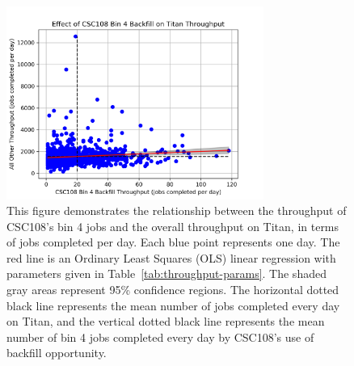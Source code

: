 \begin{figure}
  \includegraphics[width=0.75\textwidth]{images/linfit-throughput-bin4.png}
\caption{This figure demonstrates the relationship between the throughput of
CSC108's bin 4 jobs and the overall throughput on Titan, in terms of jobs
completed per day. Each blue point represents one day. The red line is an
Ordinary Least Squares (OLS) linear regression with parameters given in
Table~\ref{tab:throughput-params}. The shaded gray areas represent 95\%
confidence regions. The horizontal dotted black line represents the mean number
of jobs completed every day on Titan, and the vertical dotted black line
represents the mean number of bin 4 jobs completed every day by CSC108's use of
backfill opportunity.}
\label{fig:throughput-bin4}
\end{figure}


